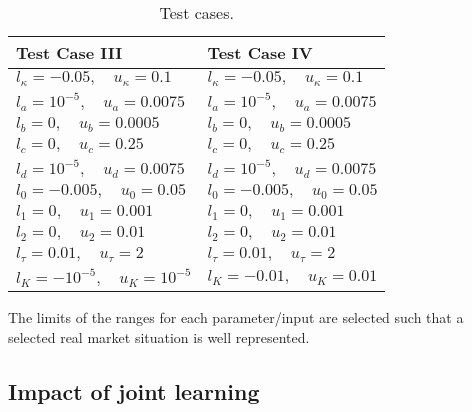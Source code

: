 \begin{table}[h!]
\begin{tabular}{l|l}
                    \hline\hline
                    Test Case III & Test Case IV \\
                    \hline
                    $l_\kappa = -0.05, \quad u_\kappa = 0.1$ & $l_\kappa = -0.05, \quad u_\kappa = 0.1$ \\
                    $l_a = 10^{-5}, \quad u_a = 0.0075$ & $l_a = 10^{-5}, \quad u_a = 0.0075$ \\
                    $l_b = 0, \quad u_b = 0.0005$ & $l_b = 0, \quad u_b = 0.0005$ \\
                    $l_c = 0, \quad u_c = 0.25$ & $l_c = 0, \quad u_c = 0.25$ \\
                    $l_d = 10^{-5}, \quad u_d = 0.0075$ & $l_d = 10^{-5}, \quad u_d = 0.0075$ \\
                    $l_0 = -0.005, \quad u_0 = 0.05$ & $l_0 = -0.005, \quad u_0 = 0.05$ \\
                    $l_1 = 0, \quad u_1 = 0.001$ & $l_1 = 0, \quad u_1 = 0.001$ \\
                    $l_2 = 0, \quad u_2 = 0.01$ & $l_2 = 0, \quad u_2 = 0.01$ \\
                    $l_\tau = 0.01, \quad u_\tau = 2$ & $l_\tau = 0.01, \quad u_\tau = 2$ \\
                    $l_K = -10^{-5}, \quad u_K = 10^{-5}$ & $l_K = -0.01, \quad u_K = 0.01$ \\
                    \hline
                \end{tabular}
                \caption{Test cases.}
                \label{tab:test_cases}
            \end{table}
    
    

                
            The limits of the ranges for each parameter/input are selected such that a selected real market situation is well represented.


	\subsection{Impact of joint learning}\label{sec:joint}
	
